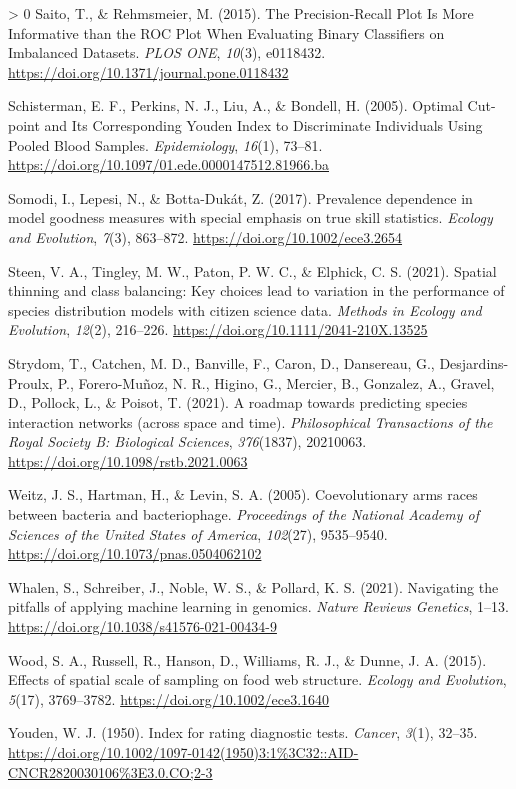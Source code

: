 \documentclass[11pt]{article}
\newlength{\cslhangindent}
\newenvironment{CSLReferences}[3] %
 {%
  \setlength{\parindent}{0pt}
  \ifodd #1 \everypar{\setlength{\hangindent}{\cslhangindent}}\ignorespaces\fi
  \ifnum #2 > 0
  \setlength{\parskip}{#2\baselineskip}
  \fi
 }%
 {}
\begin{document}
\begin{CSLReferences}{1}{0}
\leavevmode\hypertarget{ref-Saito2015PrePlo}{}%
Saito, T., \& Rehmsmeier, M. (2015). The Precision-Recall Plot Is More
Informative than the ROC Plot When Evaluating Binary Classifiers on
Imbalanced Datasets. \emph{PLOS ONE}, \emph{10}(3), e0118432.
\url{https://doi.org/10.1371/journal.pone.0118432}

\leavevmode\hypertarget{ref-Schisterman2005OptCut}{}%
Schisterman, E. F., Perkins, N. J., Liu, A., \& Bondell, H. (2005).
Optimal Cut-point and Its Corresponding Youden Index to Discriminate
Individuals Using Pooled Blood Samples. \emph{Epidemiology},
\emph{16}(1), 73--81.
\url{https://doi.org/10.1097/01.ede.0000147512.81966.ba}

\leavevmode\hypertarget{ref-Somodi2017PreDep}{}%
Somodi, I., Lepesi, N., \& Botta-Dukát, Z. (2017). Prevalence dependence
in model goodness measures with special emphasis on true skill
statistics. \emph{Ecology and Evolution}, \emph{7}(3), 863--872.
\url{https://doi.org/10.1002/ece3.2654}

\leavevmode\hypertarget{ref-Steen2021SpaThi}{}%
Steen, V. A., Tingley, M. W., Paton, P. W. C., \& Elphick, C. S. (2021).
Spatial thinning and class balancing: Key choices lead to variation in
the performance of species distribution models with citizen science
data. \emph{Methods in Ecology and Evolution}, \emph{12}(2), 216--226.
\url{https://doi.org/10.1111/2041-210X.13525}

\leavevmode\hypertarget{ref-Strydom2021RoaPre}{}%
Strydom, T., Catchen, M. D., Banville, F., Caron, D., Dansereau, G.,
Desjardins-Proulx, P., Forero-Muñoz, N. R., Higino, G., Mercier, B.,
Gonzalez, A., Gravel, D., Pollock, L., \& Poisot, T. (2021). A roadmap
towards predicting species interaction networks (across space and time).
\emph{Philosophical Transactions of the Royal Society B: Biological
Sciences}, \emph{376}(1837), 20210063.
\url{https://doi.org/10.1098/rstb.2021.0063}

\leavevmode\hypertarget{ref-Weitz2005CoeArm}{}%
Weitz, J. S., Hartman, H., \& Levin, S. A. (2005). Coevolutionary arms
races between bacteria and bacteriophage. \emph{Proceedings of the
National Academy of Sciences of the United States of America},
\emph{102}(27), 9535--9540.
\url{https://doi.org/10.1073/pnas.0504062102}

\leavevmode\hypertarget{ref-Whalen2021NavPit}{}%
Whalen, S., Schreiber, J., Noble, W. S., \& Pollard, K. S. (2021).
Navigating the pitfalls of applying machine learning in genomics.
\emph{Nature Reviews Genetics}, 1--13.
\url{https://doi.org/10.1038/s41576-021-00434-9}

\leavevmode\hypertarget{ref-Wood2015EffSpa}{}%
Wood, S. A., Russell, R., Hanson, D., Williams, R. J., \& Dunne, J. A.
(2015). Effects of spatial scale of sampling on food web structure.
\emph{Ecology and Evolution}, \emph{5}(17), 3769--3782.
\url{https://doi.org/10.1002/ece3.1640}

\leavevmode\hypertarget{ref-Youden1950IndRat}{}%
Youden, W. J. (1950). Index for rating diagnostic tests. \emph{Cancer},
\emph{3}(1), 32--35.
\url{https://doi.org/10.1002/1097-0142(1950)3:1\%3C32::AID-CNCR2820030106\%3E3.0.CO;2-3}

\end{CSLReferences}
\end{document}
